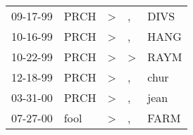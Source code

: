 \begin{supertabular}{lllll}
 09-17-99 &  PRCH &  \textgreater &             , &  DIVS \\
 10-16-99 &  PRCH &  \textgreater &             , &  HANG \\
 10-22-99 &  PRCH &  \textgreater &  \textgreater &  RAYM \\
 12-18-99 &  PRCH &  \textgreater &             , &  chur \\
 03-31-00 &  PRCH &  \textgreater &             , &  jean \\
 07-27-00 &  fool &  \textgreater &             , &  FARM \\
\end{supertabular}
